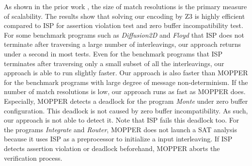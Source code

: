 As shown in the prior work \cite{}, the size of match resolutions is the primary measure of scalability.
The results show that solving our encoding by Z3 is highly efficient compared to ISP for assertion violation test and zero buffer incompatibility test. For some benchmark programs such as \textit{Diffusion2D} and \textit{Floyd} that ISP does not terminate after traversing a large number of interleavings, our approach returns under a second in most tests. Even for the benchmark programs that ISP terminates after traversing only a small subset of all the interleavings, our approach is able to run slightly faster. Our approach is also faster than MOPPER for the benchmark programs with large degree of message non-determinism. If the number of match resolutions is low, our approach runs as fast as MOPPER does. Especially, MOPPER detects a deadlock for the program \textit{Monte} under zero buffer configuration. This deadlock is not caused by zero buffer incompatibility. As such, our approach is not able to detect it. Note that ISP fails this deadlock too. For the programs \textit{Integrate} and \textit{Router}, MOPPER does not launch a SAT analysis because it uses ISP as a preprocessor to initialize a input interleaving. If ISP detects assertion violation or deadlock beforehand, MOPPER aborts the verification process. 


